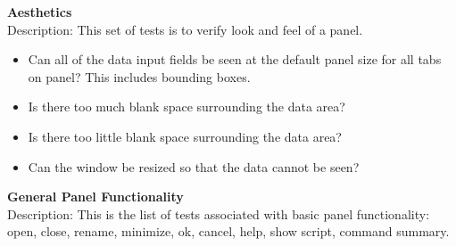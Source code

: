 
\noindent\textbf{Aesthetics}\\

\noindent Description:  This set of tests is to verify look and feel
of a panel.

%
\begin{itemize}
    \item Can all of the data input fields be seen at the default panel
    size for all tabs on panel?  This includes bounding boxes.
    \item Is there too much blank space surrounding the data area?
    \item Is there too little blank space surrounding the data area?
    \item Can the window be resized so that the data cannot be seen?
\end{itemize}
\vspace{.25 in}

%
\noindent\textbf{General Panel Functionality}\\

\noindent Description:  This is the list of tests associated with
basic  panel functionality: open, close, rename, minimize, ok,
cancel, help, show script, command summary.

